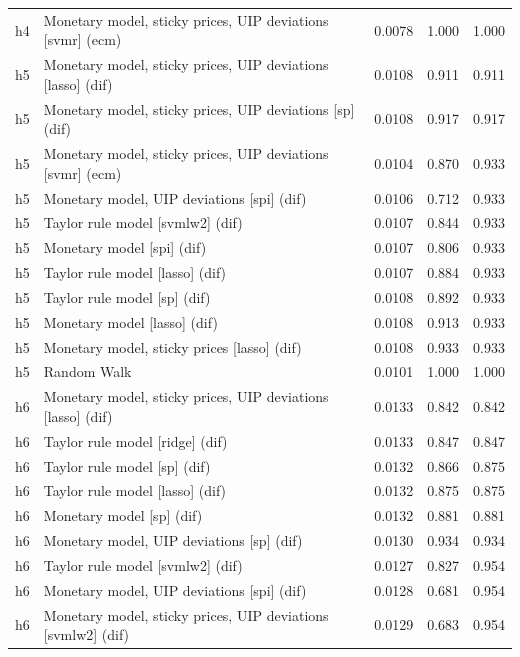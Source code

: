 \begin{ThreePartTable}
\begin{longtable}[t]{cp{5.5cm}ccc}
h4 & \raggedright Monetary model, sticky prices, UIP deviations [svmr] (ecm) & 0.0078 & 1.000 & 1.000\\
\addlinespace
h5 & \raggedright Monetary model, sticky prices, UIP deviations [lasso] (dif) & 0.0108 & 0.911 & 0.911\\
h5 & \raggedright Monetary model, sticky prices, UIP deviations [sp] (dif) & 0.0108 & 0.917 & 0.917\\
h5 & \raggedright Monetary model, sticky prices, UIP deviations [svmr] (ecm) & 0.0104 & 0.870 & 0.933\\
h5 & \raggedright Monetary model, UIP deviations [spi] (dif) & 0.0106 & 0.712 & 0.933\\
h5 & \raggedright Taylor rule model [svmlw2] (dif) & 0.0107 & 0.844 & 0.933\\
h5 & \raggedright Monetary model [spi] (dif) & 0.0107 & 0.806 & 0.933\\
h5 & \raggedright Taylor rule model [lasso] (dif) & 0.0107 & 0.884 & 0.933\\
h5 & \raggedright Taylor rule model [sp] (dif) & 0.0108 & 0.892 & 0.933\\
h5 & \raggedright Monetary model [lasso] (dif) & 0.0108 & 0.913 & 0.933\\
h5 & \raggedright Monetary model, sticky prices [lasso] (dif) & 0.0108 & 0.933 & 0.933\\
h5 & \raggedright Random Walk & 0.0101 & 1.000 & 1.000\\
\addlinespace
h6 & \raggedright Monetary model, sticky prices, UIP deviations [lasso] (dif) & 0.0133 & 0.842 & 0.842\\
h6 & \raggedright Taylor rule model [ridge] (dif) & 0.0133 & 0.847 & 0.847\\
h6 & \raggedright Taylor rule model [sp] (dif) & 0.0132 & 0.866 & 0.875\\
h6 & \raggedright Taylor rule model [lasso] (dif) & 0.0132 & 0.875 & 0.875\\
h6 & \raggedright Monetary model [sp] (dif) & 0.0132 & 0.881 & 0.881\\
h6 & \raggedright Monetary model, UIP deviations [sp] (dif) & 0.0130 & 0.934 & 0.934\\
h6 & \raggedright Taylor rule model [svmlw2] (dif) & 0.0127 & 0.827 & 0.954\\
h6 & \raggedright Monetary model, UIP deviations [spi] (dif) & 0.0128 & 0.681 & 0.954\\
h6 & \raggedright Monetary model, sticky prices, UIP deviations [svmlw2] (dif) & 0.0129 & 0.683 & 0.954\\

\end{longtable}
\end{ThreePartTable}
